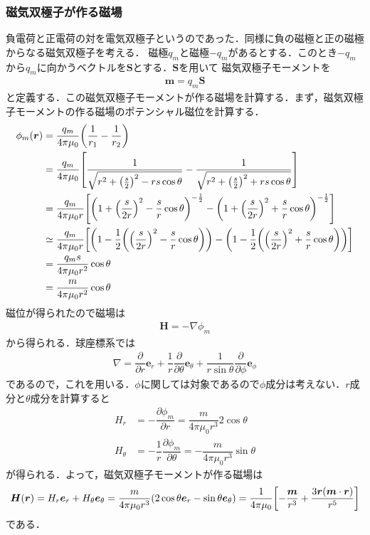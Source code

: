 \documentclass{report}
\begin{document}
  \subsubsection{磁気双極子が作る磁場}
  負電荷と正電荷の対を電気双極子というのであった．同様に負の磁極と正の磁極からなる磁気双極子を考える．
  磁極$q_m$と磁極$-q_m$があるとする．このとき$-q_m$から$q_m$に向かうベクトルを$\bm{S}$とする．$\bm{S}$を用いて
  磁気双極子モーメントを
  \begin{align}
    \bm{m} = q_m \bm{S}
  \end{align}
  と定義する．この磁気双極子モーメントが作る磁場を計算する．まず，磁気双極子モーメントの作る磁場のポテンシャル$磁位$を計算する．
  \begin{align}
    \phi_m(\bm{r}) &= \frac{q_m}{4\pi\mu_0}\qty(\frac{1}{r_1} - \frac{1}{r_2})\\
    &= \frac{q_m}{4\pi\mu_0}\qty[\frac{1}{\sqrt{r^2+\qty(\frac{s}{2})^2 - rs\cos\theta}} - \frac{1}{\sqrt{r^2+\qty(\frac{s}{2})^2 + rs\cos\theta}}]\\
    &= \frac{q_m}{4\pi\mu_0 r}\qty[\qty(1 + \qty(\frac{s}{2r})^2 - \frac{s}{r}\cos\theta)^{-\frac{1}{2}} - \qty(1 + \qty(\frac{s}{2r})^2 + \frac{s}{r}\cos\theta)^{-\frac{1}{2}}]\\
    &\simeq \frac{q_m}{4\pi\mu_0 r} \qty[\qty(1 - \frac{1}{2}\qty(\qty(\frac{s}{2r})^2 - \frac{s}{r}\cos\theta)) - \qty(1 - \frac{1}{2}\qty(\qty(\frac{s}{2r})^2 + \frac{s}{r}\cos\theta))]\\
    &= \frac{q_ms}{4\pi\mu_0 r^2}\cos\theta\\
    &= \frac{m}{4\pi\mu_0 r^2}\cos\theta
  \end{align}
  磁位が得られたので磁場は
  \begin{align}
    \bm{H} = -\nabla\phi_m
  \end{align}
  から得られる．球座標系では
  \begin{align}
    \nabla = \dfrac{\partial}{\partial r}\bm{e}_r + \dfrac{1}{r}\dfrac{\partial}{\partial \theta}\bm{e}_\theta + \dfrac{1}{r\sin\theta}\dfrac{\partial}{\partial \phi}\bm{e}_\phi
  \end{align}
  であるので，これを用いる．$\phi$に関しては対象であるので$\phi$成分は考えない．$r$成分と$\theta$成分を計算すると
  \begin{align}
    H_r &= -\dfrac{\partial \phi_m}{\partial r} = \dfrac{m}{4\pi\mu_0 r^3}2\cos\theta\\
    H_\theta &= -\dfrac{1}{r}\dfrac{\partial \phi_m}{\partial \theta} = -\dfrac{m}{4\pi\mu_0 r^3}\sin\theta
  \end{align}
  が得られる．よって，磁気双極子モーメントが作る磁場は
  \begin{align}
    \bm{H}(\bm{r}) = H_r \bm{e}_r + H_\theta \bm{e}_\theta = \frac{m}{4\pi\mu_0 r^3}\qty(2\cos\theta \bm{e}_r - \sin\theta \bm{e}_\theta) = \frac{1}{4\pi\mu_0}\qty[-\frac{\bm{m}}{r^3} + \frac{3\bm{r}(\bm{m}\cdot\bm{r})}{r^5}]
  \end{align}
  である．
\end{document}
